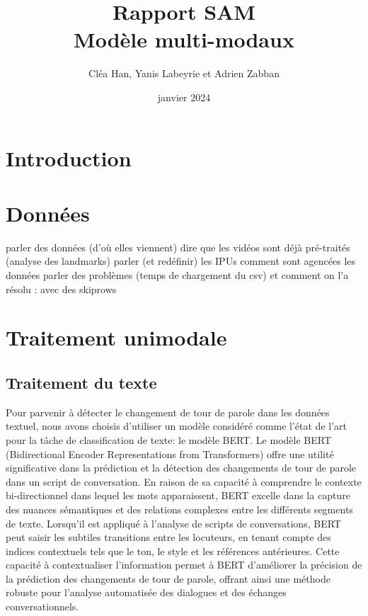\documentclass[a4paper]{article}
\title{Rapport SAM \\ Modèle multi-modaux}
\author{Cléa Han, Yanis Labeyrie et Adrien Zabban}
\date{janvier 2024}
\begin{document}
\maketitle

\section{Introduction}

\section{Données}
parler des données (d'où elles viennent)
dire que les vidéos sont déjà pré-traités (analyse des landmarks)
parler (et redéfinir) les IPUs
comment sont agencées les données
parler des problèmes (temps de chargement du csv) et comment on l'a résolu : avec des skiprows

\section{Traitement unimodale}

\subsection{Traitement du texte}

Pour parvenir à détecter le changement de tour de parole dans les données textuel, nous avons choisis d'utiliser un modèle considéré comme l'état de l'art pour la tâche de classification de texte: le modèle BERT. Le modèle BERT (Bidirectional Encoder Representations from Transformers) offre une utilité significative dans la prédiction et la détection des changements de tour de parole dans un script de conversation. En raison de sa capacité à comprendre le contexte bi-directionnel dans lequel les mots apparaissent, BERT excelle dans la capture des nuances sémantiques et des relations complexes entre les différents segments de texte. Lorsqu'il est appliqué à l'analyse de scripts de conversations, BERT peut saisir les subtiles transitions entre les locuteurs, en tenant compte des indices contextuels tels que le ton, le style et les références antérieures. Cette capacité à contextualiser l'information permet à BERT d'améliorer la précision de la prédiction des changements de tour de parole, offrant ainsi une méthode robuste pour l'analyse automatisée des dialogues et des échanges conversationnels.
\end{document}
